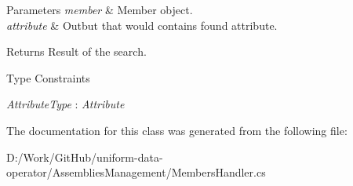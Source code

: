 \begin{DoxyParams}{Parameters}
{\em member} & Member object.\\
\hline
{\em attribute} & Outbut that would contains found attribute.\\
\hline
\end{DoxyParams}
\begin{DoxyReturn}{Returns}
Result of the search.
\end{DoxyReturn}
\begin{Desc}
\item[Type Constraints]\begin{description}
\item[{\em Attribute\+Type} : {\em Attribute}]\end{description}
\end{Desc}


The documentation for this class was generated from the following file\+:\begin{DoxyCompactItemize}
\item 
D\+:/\+Work/\+Git\+Hub/uniform-\/data-\/operator/\+Assemblies\+Management/Members\+Handler.\+cs\end{DoxyCompactItemize}
